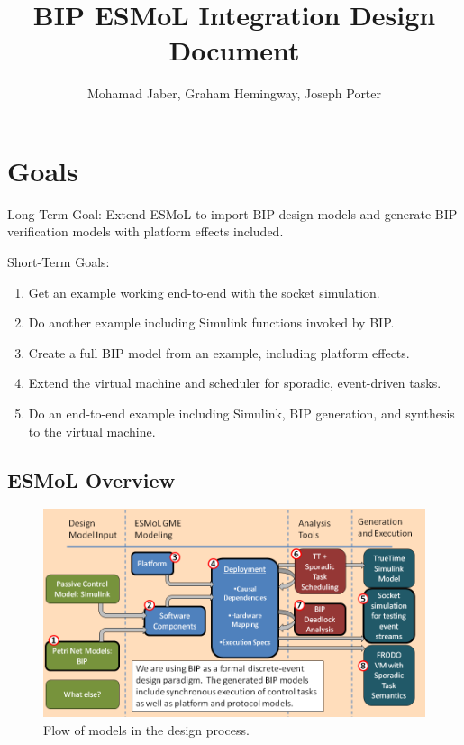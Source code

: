 \title {BIP ESMoL Integration Design Document}
\author {Mohamad Jaber, Graham Hemingway, Joseph Porter}
\maketitle

\section{Goals}

Long-Term Goal: Extend ESMoL to import BIP design models and generate BIP verification models with platform effects included.

Short-Term Goals:

\begin{enumerate}
\item Get an example working end-to-end with the socket simulation.
\item Do another example including Simulink functions invoked by BIP.
\item Create a full BIP model from an example, including platform effects.
\item Extend the virtual machine and scheduler for sporadic, event-driven tasks.
\item Do an end-to-end example including Simulink, BIP generation, and synthesis to the virtual machine.
\end{enumerate}

\subsection{ESMoL Overview}

\begin{figure}[htb]
	\centering
		\includegraphics[width=1.00\textwidth]{figures/tool_diagram.png}
	\caption{Flow of models in the design process.}
	\label{fig:tool_diagram}
\end{figure}


